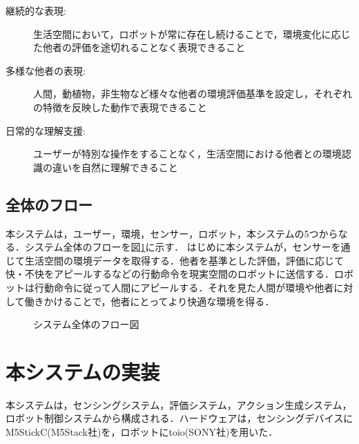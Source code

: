 \documentclass[paper=a4paper,jafontsize=9pt,head_space=15mm,gutter=20mm,
twocolumn,number_of_lines=49, line_length=26zw]{myuarticle}
\begin{document}
\begin{description}
  \item[継続的な表現:] 生活空間において，ロボットが常に存在し続けることで，環境変化に応じた他者の評価を途切れることなく表現できること
  \item[多様な他者の表現:] 人間，動植物，非生物など様々な他者の環境評価基準を設定し，それぞれの特徴を反映した動作で表現できること
  \item[日常的な理解支援:] ユーザーが特別な操作をすることなく，生活空間における他者との環境認識の違いを自然に理解できること
\end{description}

\subsection{全体のフロー}
本システムは，ユーザー，環境，センサー，ロボット，本システムの5つからなる．システム全体のフローを図\ref{fig:system-flow}に示す．
はじめに本システムが，センサーを通じて生活空間の環境データを取得する．他者を基準とした評価，評価に応じて快・不快をアピールするなどの行動命令を現実空間のロボットに送信する．ロボットは行動命令に従って人間にアピールする．それを見た人間が環境や他者に対して働きかけることで，他者にとってより快適な環境を得る．

\fboxsep=0pt            %
\fboxrule=1pt            %
\begin{figure}[h]
  \centering
  \caption{システム全体のフロー図}
  \label{fig:system-flow}
\end{figure}



\section{本システムの実装}
本システムは，センシングシステム，評価システム，アクション生成システム，ロボット制御システムから構成される．ハードウェアは，センシングデバイスにM5StickC(M5Stack社)を，ロボットにtoio(SONY社)を用いた．
\end{document}
